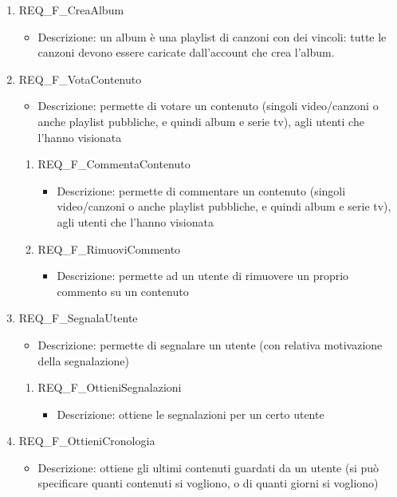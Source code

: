 \begin{enumerate}
	\item REQ\_F\_CreaAlbum
		\begin{itemize}	
			\item Descrizione: un album è una playlist di canzoni con dei vincoli: tutte le canzoni devono essere caricate dall'account che crea l'album.
		\end{itemize}

	\item REQ\_F\_VotaContenuto
		\begin{itemize}	
			\item Descrizione: permette di votare un contenuto (singoli video/canzoni o anche playlist pubbliche, e quindi album e serie tv), agli utenti che l'hanno visionata
		\end{itemize}
		\begin{enumerate}[label*=\arabic*.]
		\item REQ\_F\_CommentaContenuto
			\begin{itemize}	
				\item Descrizione: permette di commentare un contenuto (singoli video/canzoni o anche playlist pubbliche, e quindi album e serie tv), agli utenti che l'hanno visionata
			\end{itemize}
		\item REQ\_F\_RimuoviCommento
			\begin{itemize}	
				\item Descrizione: permette ad un utente di rimuovere un proprio commento su un contenuto
			\end{itemize}
		\end{enumerate}
	
	\item REQ\_F\_SegnalaUtente
		\begin{itemize}	
			\item Descrizione: permette di segnalare un utente (con relativa motivazione della segnalazione)
		\end{itemize}
		\begin{enumerate}[label*=\arabic*.]
		\item REQ\_F\_OttieniSegnalazioni
			\begin{itemize}	
				\item Descrizione: ottiene le segnalazioni per un certo utente
			\end{itemize}
		\end{enumerate}

	\item REQ\_F\_OttieniCronologia
		\begin{itemize}	
			\item Descrizione: ottiene gli ultimi contenuti guardati da un utente (si può specificare quanti contenuti si vogliono, o di quanti giorni si vogliono)
		\end{itemize}


\end{enumerate}
